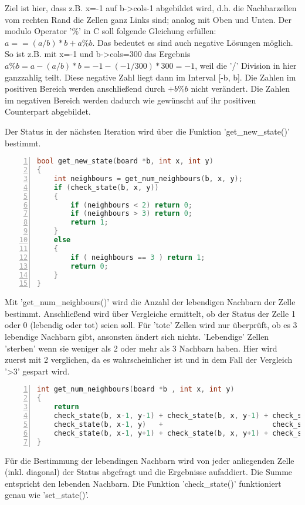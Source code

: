 \documentclass[plainarticle,zihtitle,german,final,hyperref,utf8]{zihpub}
\begin{document}
Ziel ist hier, dass z.B. x=-1 auf b->cols-1 abgebildet wird, d.h. die Nachbarzellen vom rechten Rand die Zellen ganz Links sind; analog mit Oben und Unten.
Der modulo Operator '\%' in C soll folgende Gleichung erfüllen: \begin{math}a == (a / b) * b + a \% b\end{math}. Das bedeutet es sind auch negative Lösungen möglich. So ist z.B. mit x=-1 und b->cols=300 das Ergebnis \newline\begin{math}a \% b = a - (a/b)*b = -1 - (-1/300) * 300 = -1\end{math},\newline 
weil die '/' Division in hier ganzzahlig teilt.
Diese negative Zahl liegt dann im Interval [-b, b]. Die Zahlen im positiven Bereich werden anschließend durch \begin{math}+b \% b\end{math} nicht verändert. Die Zahlen im negativen Bereich werden dadurch wie gewünscht auf ihr positiven Counterpart abgebildet. 

Der Status in der nächsten Iteration wird über die Funktion 'get\_new\_state()' bestimmt.
\begin{lstlisting}[language=c, numbers=left]
bool get_new_state(board *b, int x, int y)
{
	int neighbours = get_num_neighbours(b, x, y);
	if (check_state(b, x, y))
	{
		if (neighbours < 2) return 0;
		if (neighbours > 3) return 0;
		return 1;
	}
	else
	{
		if ( neighbours == 3 ) return 1;
		return 0;
	}
}
\end{lstlisting}
Mit 'get\_num\_neighbours()' wird die Anzahl der lebendigen Nachbarn der Zelle bestimmt. Anschließend wird über Vergleiche ermittelt, ob der Status der Zelle 1 oder 0 (lebendig oder tot) seien soll.
Für 'tote' Zellen wird nur überprüft, ob es 3 lebendige Nachbarn gibt, ansonsten ändert sich nichts. 'Lebendige' Zellen 'sterben' wenn sie weniger als 2 oder mehr als 3 Nachbarn haben. Hier wird zuerst mit 2 verglichen, da es wahrscheinlicher ist und in dem Fall der Vergleich '>3' gespart wird.\newline

\begin{lstlisting}[language=c, numbers=left]
int get_num_neighbours(board *b , int x, int y)
{
	return
	check_state(b, x-1, y-1) + check_state(b, x, y-1) + check_state(b, x+1, y-1) +
	check_state(b, x-1, y)   +                          check_state(b, x+1, y) +
	check_state(b, x-1, y+1) + check_state(b, x, y+1) + check_state(b, x+1, y+1);
}
\end{lstlisting}
Für die Bestimmung der lebendingen Nachbarn wird von jeder anliegenden Zelle (inkl. diagonal) der Status abgefragt und die Ergebnisse aufaddiert. Die Summe entspricht den lebenden Nachbarn. Die Funktion 'check\_state()' funktioniert genau wie 'set\_state()'.
\end{document}
